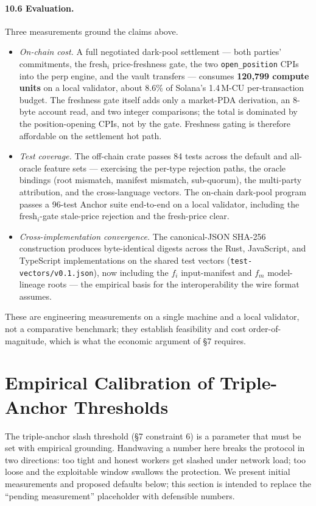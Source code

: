 \documentclass[11pt]{article}
\begin{document}
\paragraph{10.6 Evaluation.} Three measurements ground the claims above.
\begin{itemize}
\item \emph{On-chain cost.} A full negotiated dark-pool settlement --- both parties' commitments, the $\mathrm{fresh}_i$ price-freshness gate, the two \texttt{open\_position} CPIs into the perp engine, and the vault transfers --- consumes \textbf{120{,}799 compute units} on a local validator, about 8.6\% of Solana's 1.4\,M-CU per-transaction budget. The freshness gate itself adds only a market-PDA derivation, an 8-byte account read, and two integer comparisons; the total is dominated by the position-opening CPIs, not by the gate. Freshness gating is therefore affordable on the settlement hot path.
\item \emph{Test coverage.} The off-chain crate passes 84 tests across the default and all-oracle feature sets --- exercising the per-type rejection paths, the oracle bindings (root mismatch, manifest mismatch, sub-quorum), the multi-party attribution, and the cross-language vectors. The on-chain dark-pool program passes a 96-test Anchor suite end-to-end on a local validator, including the $\mathrm{fresh}_i$-gate stale-price rejection and the fresh-price clear.
\item \emph{Cross-implementation convergence.} The canonical-JSON SHA-256 construction produces byte-identical digests across the Rust, JavaScript, and TypeScript implementations on the shared test vectors (\texttt{test-vectors/v0.1.json}), now including the $f_i$ input-manifest and $f_m$ model-lineage roots --- the empirical basis for the interoperability the wire format assumes.
\end{itemize}
These are engineering measurements on a single machine and a local validator, not a comparative benchmark; they establish feasibility and cost order-of-magnitude, which is what the economic argument of \S7 requires.

\section{Empirical Calibration of Triple-Anchor Thresholds}

The triple-anchor slash threshold (\S7 constraint 6) is a parameter that must be set with empirical grounding. Handwaving a number here breaks the protocol in two directions: too tight and honest workers get slashed under network load; too loose and the exploitable window swallows the protection. We present initial measurements and proposed defaults below; this section is intended to replace the ``pending measurement'' placeholder with defensible numbers.
\end{document}
